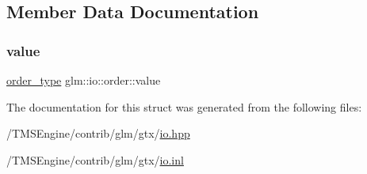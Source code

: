 \subsection{Member Data Documentation}
\mbox{\label{structglm_1_1io_1_1order_aa8788dd0568bacd081d02bd5aca9889b}} 
\subsubsection{\texorpdfstring{value}{value}}
{\footnotesize\ttfamily \hyperlink{namespaceglm_1_1io_a3497781803fe594a37177e05ab2a795f}{order\+\_\+type} glm\+::io\+::order\+::value}



The documentation for this struct was generated from the following files\+:\begin{DoxyCompactItemize}
\item 
/\+T\+M\+S\+Engine/contrib/glm/gtx/\hyperlink{io_8hpp}{io.\+hpp}\item 
/\+T\+M\+S\+Engine/contrib/glm/gtx/\hyperlink{io_8inl}{io.\+inl}\end{DoxyCompactItemize}
